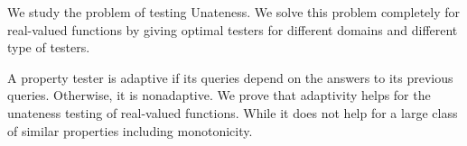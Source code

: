 We study the problem of testing Unateness. We solve this problem completely for real-valued functions by giving optimal testers for different domains and different type of testers.

A property tester is adaptive if its queries depend on the answers to its previous queries. Otherwise, it is nonadaptive. We prove that adaptivity helps for the unateness testing of real-valued functions. While it does not help for a large class of similar properties including monotonicity.
